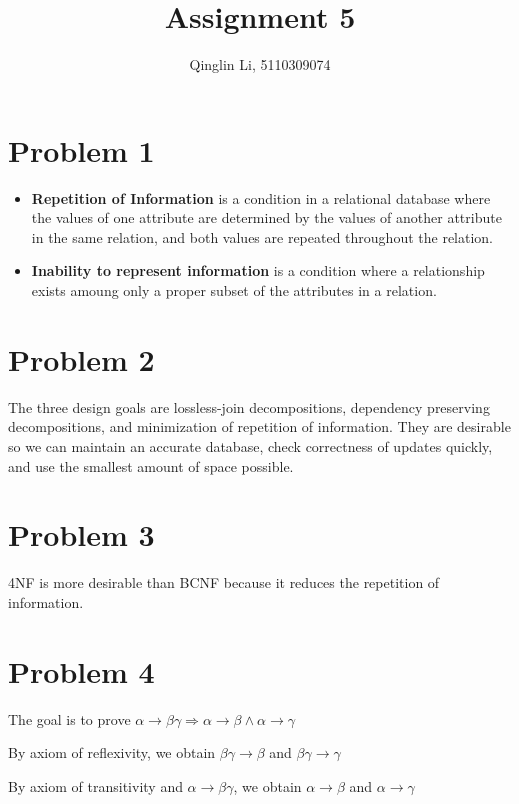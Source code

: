 \documentclass[a4paper,11pt]{article}
\begin{document}
 
\pagestyle{fancy}
\rfoot{\thepage}
\setlength{\parskip}{0.7ex plus0.2ex minus0.2ex}
\cfoot{\empty}
\lhead{\empty}
 
 
\title{Assignment 5}
\author{Qinglin Li, 5110309074}
\date{}
\maketitle
 
\headheight 3pt
\thispagestyle{fancy}

\section*{Problem 1}
\begin{itemize}
\item
\textbf{Repetition of Information} is a condition in a relational database where the values of one attribute are determined by the values of another attribute in the same relation, and both values are repeated throughout the relation.

\item
\textbf{Inability to represent information} is a condition where a relationship exists amoung only a proper subset of the attributes in a relation.
\end{itemize}

\section*{Problem 2}
The three design goals are lossless-join decompositions, dependency preserving decompositions, and minimization of repetition of information. They are desirable so we can maintain an accurate database, check correctness of updates quickly, and use the smallest amount of space possible.

\section*{Problem 3}
4NF is more desirable than BCNF because it reduces the repetition of information.

\section*{Problem 4}
The goal is to prove $\alpha\rightarrow \beta\gamma \Longrightarrow \alpha\rightarrow\beta \wedge\alpha\rightarrow\gamma$\par
By axiom of reflexivity, we obtain $\beta\gamma\rightarrow\beta$ and $\beta\gamma\rightarrow\gamma$\par
By axiom of transitivity and $\alpha\rightarrow \beta\gamma$, we obtain $\alpha\rightarrow\beta$ and $\alpha\rightarrow\gamma$
\end{document}
